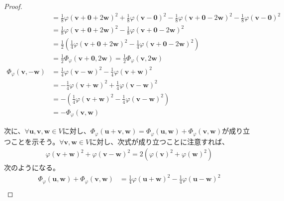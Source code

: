\documentclass[dvipdfmx]{jsarticle}
\begin{document}
\begin{proof}
\begin{align*}
&= \frac{1}{8}{\varphi\left( \mathbf{v} + \mathbf{0} + 2\mathbf{w} \right)}^{2} + \frac{1}{8}{\varphi\left( \mathbf{v} - \mathbf{0} \right)}^{2} - \frac{1}{8}{\varphi\left( \mathbf{v} + \mathbf{0} - 2\mathbf{w} \right)}^{2} - \frac{1}{8}{\varphi\left( \mathbf{v} - \mathbf{0} \right)}^{2}\\
&= \frac{1}{8}{\varphi\left( \mathbf{v} + \mathbf{0} + 2\mathbf{w} \right)}^{2} - \frac{1}{8}{\varphi\left( \mathbf{v} + \mathbf{0} - 2\mathbf{w} \right)}^{2}\\
&= \frac{1}{2}\left( \frac{1}{4}{\varphi\left( \mathbf{v} + \mathbf{0} + 2\mathbf{w} \right)}^{2} - \frac{1}{4}{\varphi\left( \mathbf{v} + \mathbf{0} - 2\mathbf{w} \right)}^{2} \right)\\
&= \frac{1}{2}\varPhi_{\varphi}\left( \mathbf{v} + \mathbf{0},2\mathbf{w} \right) = \frac{1}{2}\varPhi_{\varphi}\left( \mathbf{v},2\mathbf{w} \right) \\
\varPhi_{\varphi}\left( \mathbf{v}, - \mathbf{w} \right) &= \frac{1}{4}{\varphi\left( \mathbf{v} - \mathbf{w} \right)}^{2} - \frac{1}{4}{\varphi\left( \mathbf{v} + \mathbf{w} \right)}^{2}\\
&= - \frac{1}{4}{\varphi\left( \mathbf{v} + \mathbf{w} \right)}^{2} + \frac{1}{4}{\varphi\left( \mathbf{v} - \mathbf{w} \right)}^{2}\\
&= - \left( \frac{1}{4}{\varphi\left( \mathbf{v} + \mathbf{w} \right)}^{2} - \frac{1}{4}{\varphi\left( \mathbf{v} - \mathbf{w} \right)}^{2} \right)\\
&= - \varPhi_{\varphi}\left( \mathbf{v},\mathbf{w} \right)
\end{align*}\par
次に、$\forall\mathbf{u},\mathbf{v},\mathbf{w} \in V$に対し、$\varPhi_{\varphi}\left( \mathbf{u} + \mathbf{v},\mathbf{w} \right) = \varPhi_{\varphi}\left( \mathbf{u},\mathbf{w} \right) + \varPhi_{\varphi}\left( \mathbf{v},\mathbf{w} \right)$が成り立つことを示そう。$\forall\mathbf{v},\mathbf{w} \in V$に対し、次式が成り立つことに注意すれば、
\begin{align*}
{\varphi\left( \mathbf{v} + \mathbf{w} \right)}^{2} + {\varphi\left( \mathbf{v} - \mathbf{w} \right)}^{2} = 2\left( {\varphi\left( \mathbf{v} \right)}^{2} + {\varphi\left( \mathbf{w} \right)}^{2} \right)
\end{align*}
次のようになる。
\begin{align*}
\varPhi_{\varphi}\left( \mathbf{u},\mathbf{w} \right) + \varPhi_{\varphi}\left( \mathbf{v},\mathbf{w} \right) &= \frac{1}{4}{\varphi\left( \mathbf{u} + \mathbf{w} \right)}^{2} - \frac{1}{4}{\varphi\left( \mathbf{u} - \mathbf{w} \right)}^{2} \\

\end{align*}
\end{proof}
\end{document}
